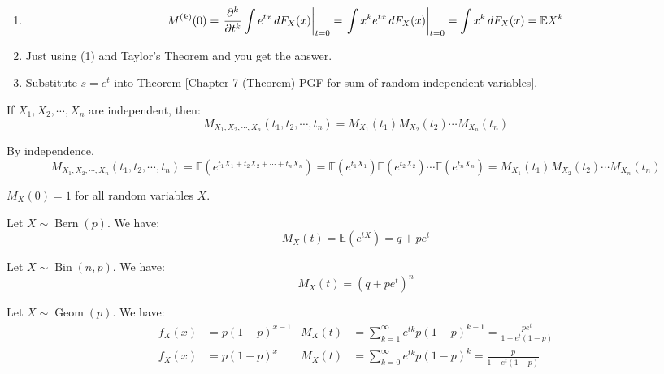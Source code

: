 \documentclass{huhtakm-template-book}
\newcommand{\expect}{\mathbb{E}}
\DeclareMathOperator{\Bern}{Bern}
\DeclareMathOperator{\Bin}{Bin}
\DeclareMathOperator{\Geom}{Geom}
\begin{document}
\begin{proofing}
	\begin{enumerate}
		\item 
		\begin{equation*}
			M^{(k)}(0)=\left.\pdv*[order={k}]{\int e^{tx}\,dF_{X}(x)}{t}\right|_{t=0}=\left.\int x^{k}e^{tx}\,dF_{X}(x)\right|_{t=0}=\int x^{k}\,dF_{X}(x)=\expect X^{k}
		\end{equation*}
		\item Just using (1) and Taylor's Theorem and you get the answer.
		\item Substitute $s=e^{t}$ into Theorem \ref{Chapter 7 (Theorem) PGF for sum of random independent variables}.
	\end{enumerate}
\end{proofing}
\begin{lem}
	If $X_{1},X_{2},\cdots,X_{n}$ are independent, then:
	\begin{equation*}
		M_{X_{1},X_{2},\cdots,X_{n}}(t_{1},t_{2},\cdots,t_{n})=M_{X_{1}}(t_{1})M_{X_{2}}(t_{2})\cdots M_{X_{n}}(t_{n})
	\end{equation*}
\end{lem}
\begin{proofing}
	By independence,
	\begin{equation*}
		M_{X_{1},X_{2},\cdots,X_{n}}(t_{1},t_{2},\cdots,t_{n})=\expect(e^{t_{1}X_{1}+t_{2}X_{2}+\cdots+t_{n}X_{n}})=\expect(e^{t_{1}X_{1}})\expect(e^{t_{2}X_{2}})\cdots\expect(e^{t_{n}X_{n}})=M_{X_{1}}(t_{1})M_{X_{2}}(t_{2})\cdots M_{X_{n}}(t_{n})
	\end{equation*}
\end{proofing}
\begin{rem}
	$M_{X}(0)=1$ for all random variables $X$.
\end{rem}
\begin{eg}
	Let $X\sim\Bern(p)$. We have:
	\begin{equation*}
		M_{X}(t)=\expect(e^{tX})=q+pe^{t}
	\end{equation*}
\end{eg}
\begin{eg}
	Let $X\sim\Bin(n,p)$. We have:
	\begin{equation*}
		M_{X}(t)=(q+pe^{t})^{n}
	\end{equation*}
\end{eg}
\begin{eg}
	Let $X\sim\Geom(p)$. We have:
	\begin{align*}
		f_{X}(x)&=p(1-p)^{x-1} & M_{X}(t)&=\sum_{k=1}^{\infty}e^{tk}p(1-p)^{k-1}=\frac{pe^{t}}{1-e^{t}(1-p)}\\
		f_{X}(x)&=p(1-p)^{x} & M_{X}(t)&=\sum_{k=0}^{\infty}e^{tk}p(1-p)^{k}=\frac{p}{1-e^{t}(1-p)}
	\end{align*}
\end{eg}
\end{document}
